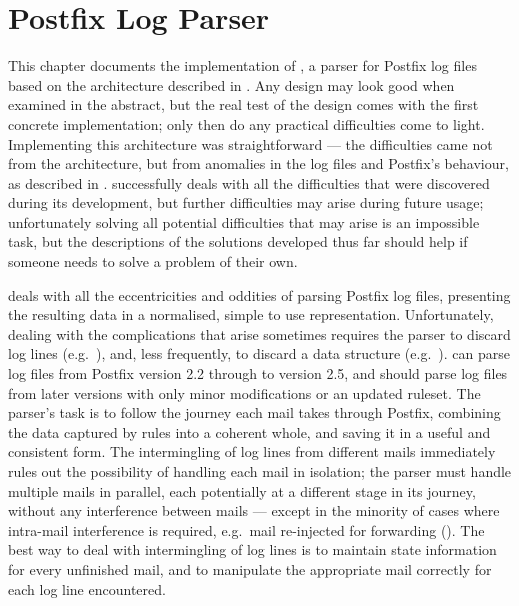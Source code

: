 \chapter{Postfix Log Parser}

\label{Postfix Parser Implementation}

This chapter documents the implementation of \parsername{}, a parser for
Postfix log files based on the architecture described in .  Any design may look good when examined in the abstract, but
the real test of the design comes with the first concrete implementation;
only then do any practical difficulties come to light.  Implementing this
architecture was straightforward --- the difficulties came not from the
architecture, but from anomalies in the log files and Postfix's behaviour,
as described in .  \parsername{} successfully
deals with all the difficulties that were discovered during its
development, but further difficulties may arise during future usage;
unfortunately solving all potential difficulties that may arise is an
impossible task, but the descriptions of the solutions developed thus far
should help if someone needs to solve a problem of their own.

\parsername{} deals with all the eccentricities and oddities of parsing
Postfix log files, presenting the resulting data in a normalised, simple to
use representation.  Unfortunately, dealing with the complications that
arise sometimes requires the parser to discard log lines (e.g.\
), and, less frequently, to discard a
data structure (e.g.\ \sectionref{timeouts during data phase}).
\parsername{} can parse log files from Postfix version 2.2 through to
version 2.5, and should parse log files from later versions with only minor
modifications or an updated ruleset.  The parser's task is to follow the
journey each mail takes through Postfix, combining the data captured by
rules into a coherent whole, and saving it in a useful and consistent form.
The intermingling of log lines from different mails immediately rules out
the possibility of handling each mail in isolation; the parser must handle
multiple mails in parallel, each potentially at a different stage in its
journey, without any interference between mails --- except in the minority
of cases where intra-mail interference is required, e.g.\ mail re-injected
for forwarding (\sectionref{Re-injected mails}).  The best way to deal with
intermingling of log lines is to maintain state information for every
unfinished mail, and to manipulate the appropriate mail correctly for each
log line encountered.

